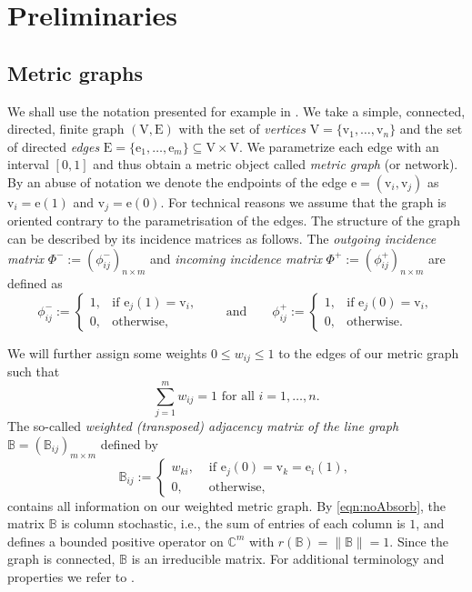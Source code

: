 \documentclass[a4paper,oneside,10pt]{amsart}
\theoremstyle{definition}
\numberwithin{equation}{section}
\def\V{\mathrm{V}}
\def\vv{\mathrm{v}}
\def\ee{\mathrm{e}}
\def\E{\mathrm{E}}
\def\CC{\mathbb{C}}
\def\BB{\mathbb{B}}
\begin{document}
\section{Preliminaries}
\subsection{Metric graphs}  
We shall use  the notation presented for example in \cite{KS2005,BKR2017}. We take a simple,  connected, directed, finite graph $(\V,\E)$ with the set of \emph{vertices} $\V=\{\vv_1,\dots,\vv_n\}$ and the set of directed \emph{edges} $ \E = \{\ee_1,\dots,\ee_m\}\subseteq \V\times\V$.
We parametrize each edge with an interval $[0,1]$ and thus obtain a metric object called \emph{metric graph} (or network). By an abuse of notation we denote the endpoints of the edge $\ee=(\vv_i ,\vv_j)$ as $\vv_i = \ee(1)$ and $\vv_j = \ee(0)$. For technical reasons we assume that the graph is oriented contrary to the parametrisation of the edges. The structure of the graph can be described by its incidence matrices as follows. 
The  \emph{outgoing incidence matrix} $\Phi^{-}:=(\phi^{-}_{ij})_{n\times m}$  and \emph{incoming incidence matrix} $\Phi^{+}:=(\phi^{+}_{ij})_{n\times m}$  are defined as
\begin{equation*}\label{eq:incident}
 \phi^{-}_{ij} := 
 \begin{cases}
  1, & \text{if } \ee_j(1) = \vv_i,\\
  0, & \text{otherwise},
 \end{cases}
 \qquad 
\text{and}
\qquad 
 \phi^{+}_{ij} := 
 \begin{cases}
  1, & \text{if } \ee_j(0) = \vv_i,\\
  0, & \text{otherwise}.
 \end{cases}
\end{equation*} 

We will further assign some weights $0 \le  w_{ij} \le 1$ to the edges of our metric graph such that
\begin{equation}\label{eqn:noAbsorb}
\sum_{j=1}^m{w_{ij}}=1 \text{ for all } i=1,\dots, n.
\end{equation}
The so-called \emph{weighted (transposed) adjacency matrix of the line graph} $\mathbb{B} = (\mathbb{B}_{ij})_{m\times m}$ defined by 
\begin{equation}\label{eqn:adjMat}
\mathbb{B}_{ij}:=\begin{cases}
w_{ki},& \text{ if } \ee_j (0)=\vv_k =\ee_i(1),\\
0, & \text{ otherwise},
\end{cases}
\end{equation}
contains all information on our weighted metric graph. By \eqref{eqn:noAbsorb}, the matrix $\mathbb{B}$ is column stochastic, i.e., the sum of entries of each column is $1$, and defines a bounded positive operator on $\CC^m$ with $r(\mathbb{B})= \|\mathbb{B}\| =1$. Since the graph is connected, $\BB$ is an irreducible matrix. For additional terminology and properties we refer to \cite[Ch.~18]{BKR2017}.
\end{document}
